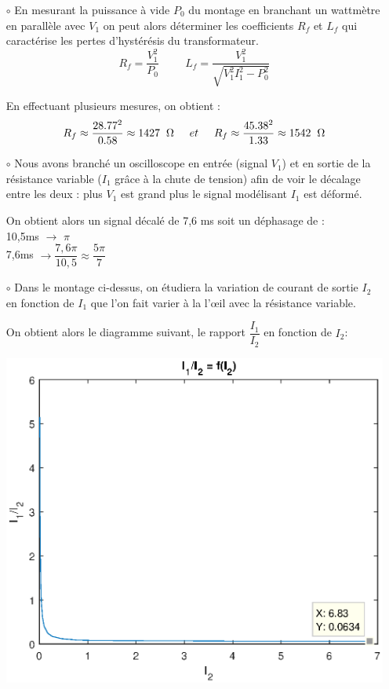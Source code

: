 \documentclass[12pt,a4paper]{article}
\begin{document}
	\begin{itemize}
		\item[$\circ$]
		En mesurant la puissance à vide $P_0$ du montage en branchant un wattmètre en parallèle avec $V_1$ on peut alors déterminer les coefficients $R_f$ et $L_f$ qui caractérise les pertes d'hystérésis du transformateur.
		$$R_f = \dfrac{V_{1}^2}{P_0} \hspace{1cm} L_f = \dfrac{V_{1}^2}{\sqrt{V_{1}^2 I_{1}^2 - P_{0}^2}}$$
		
		En effectuant plusieurs mesures, on obtient :
		$$R_f \approx \dfrac{28.77^2}{0.58} \approx 1427\hspace{0.2cm} \Omega \hspace{0.5cm} et \hspace{0.5cm}
		R_f \approx \dfrac{45.38^2}{1.33} \approx 1542\hspace{0.2cm} \Omega$$
		
		
		\item[$\circ$]
		Nous avons branché un oscilloscope en entrée (signal $V_1$) et en sortie de la résistance variable ($I_1$ grâce à la chute de tension) afin de voir le décalage entre les deux : plus $V_1$ est grand plus le signal modélisant $I_1$ est déformé.
		
		On obtient alors un signal décalé de 7,6 ms soit un déphasage de : \\
		10,5ms $\rightarrow$ $\pi$ \\
		7,6ms $\rightarrow \dfrac{7,6\pi}{10,5} \approx\dfrac{5\pi}{7}$
		\pagebreak
		\item[$\circ$]
		Dans le montage ci-dessus, on étudiera la variation de courant de sortie $I_2$ en fonction de $I_1$ que l'on fait varier à la l'œil avec la résistance variable.
		
		On obtient alors le diagramme suivant, le rapport $\dfrac{I_1}{I_2}$  en fonction de $I_2$:
		\begin{center}
			\includegraphics[width=0.8\linewidth]{res/I1I2}
		\end{center}
		

\end{itemize}
\end{document}
